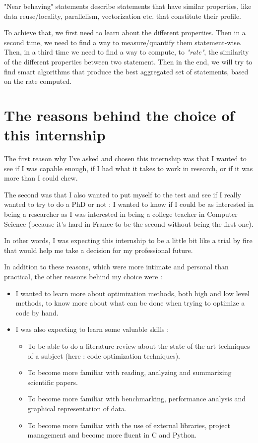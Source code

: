 \documentclass[paper=a4, fontsize=11.5pt]{scrartcl}
\numberwithin{equation}{section}        %
\numberwithin{figure}{section}          %
\numberwithin{table}{section}               %
\begin{document}
"Near behaving" statements describe statements that have similar properties,
like data reuse/locality, parallelism, vectorization etc. that constitute their profile.

To achieve that, we first need to learn about the different properties. Then in a second
time, we need to find a way to measure/quantify them statement-wise. Then, in a third
time we need to find a way to compute, to \textit{"rate"}, the similarity of the different
properties between two statement. Then in the end, we will try to find smart algorithms
that produce the best aggregated set of statements, based on the rate computed.

\section{The reasons behind the choice of this internship}
The first reason why I've asked and chosen this internship was that I wanted to see
if I was capable enough, if I had what it takes to work in research, or if it was more than I could
chew.

The second was that I also wanted to put myself to the test and see if I really 
wanted to try to do a PhD or not : I wanted to know if I could be as interested in being
a researcher as I was interested in being a college teacher in Computer Science
(because it's hard in France to be the second without being the first one).

In other words,
I was expecting this internship to be a little bit like a trial by fire that would help me
take a decision for my professional future.

\bigskip

In addition to these reasons, which were more intimate and personal than practical, the
other reasons behind my choice were :
\begin{itemize}
    \item[] I wanted to learn more about optimization methods, both high and low level methods,
        to know more about what can be done when trying to optimize a code by hand.
    \item[] I was also expecting to learn some valuable skills :
        \begin{itemize}
            \item To be able to do a literature review about the state of the art techniques of
                a subject (here : code optimization techniques).
            \item To become more familiar with reading, analyzing and summarizing scientific papers.
            \item To become more familiar with benchmarking, performance analysis and
                graphical representation of data.
            \item To become more familiar with the use of external libraries, project
                management and become more fluent in C and Python.
        \end{itemize}
\end{itemize}
\end{document}
